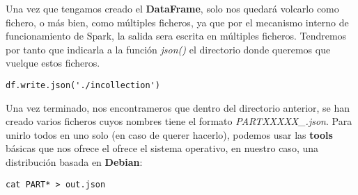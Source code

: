 Una vez que tengamos creado el \textbf{DataFrame}, solo nos quedará volcarlo como fichero, o más bien, como múltiples ficheros, ya que por el mecanismo interno de funcionamiento de Spark, la salida sera escrita en múltiples ficheros. Tendremos por tanto que indicarla a la función \textit{json()} el directorio donde queremos que vuelque estos ficheros.

\begin{verbatim}
df.write.json('./incollection')
\end{verbatim}

Una vez terminado, nos encontrameros que dentro del directorio anterior, se han creado varios ficheros cuyos nombres tiene el formato \textit{PARTXXXXX\_\*.json}. Para unirlo todos en uno solo (en caso de querer hacerlo), podemos usar las \textbf{tools} básicas que nos ofrece el ofrece el sistema operativo, en nuestro caso, una distribución basada en \textbf{Debian}:

\begin{verbatim}
cat PART* > out.json
\end{verbatim}